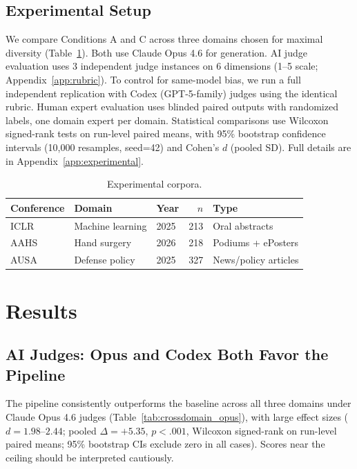 \documentclass{article}
\begin{document}
\subsection{Experimental Setup}

We compare Conditions A and C across three domains chosen for maximal diversity (Table~\ref{tab:corpora}). Both use Claude Opus 4.6 \citep{anthropic2025claude} for generation. AI judge evaluation uses 3 independent judge instances on 6 dimensions (1--5 scale; Appendix~\ref{app:rubric}). To control for same-model bias, we run a full independent replication with Codex (GPT-5-family) judges using the identical rubric. Human expert evaluation uses blinded paired outputs with randomized labels, one domain expert per domain. Statistical comparisons use Wilcoxon signed-rank tests on run-level paired means, with 95\% bootstrap confidence intervals (10,000 resamples, seed=42) and Cohen's $d$ (pooled SD). Full details are in Appendix~\ref{app:experimental}.

\begin{table}[t]
\caption{Experimental corpora.}
\label{tab:corpora}
\begin{center}
\begin{tabular}{lllrl}
\toprule
\textbf{Conference} & \textbf{Domain} & \textbf{Year} & \textbf{$n$} & \textbf{Type} \\
\midrule
ICLR & Machine learning & 2025 & 213 & Oral abstracts \\
AAHS & Hand surgery & 2026 & 218 & Podiums + ePosters \\
AUSA & Defense policy & 2025 & 327 & News/policy articles \\
\bottomrule
\end{tabular}
\end{center}
\end{table}

\section{Results}
\label{sec:results}

\subsection{AI Judges: Opus and Codex Both Favor the Pipeline}

The pipeline consistently outperforms the baseline across all three domains under Claude Opus 4.6 judges (Table~\ref{tab:crossdomain_opus}), with large effect sizes ($d{=}1.98$--$2.44$; pooled $\Delta{=}+5.35$, $p{<}.001$, Wilcoxon signed-rank on run-level paired means; 95\% bootstrap CIs exclude zero in all cases). Scores near the ceiling should be interpreted cautiously.
\end{document}
